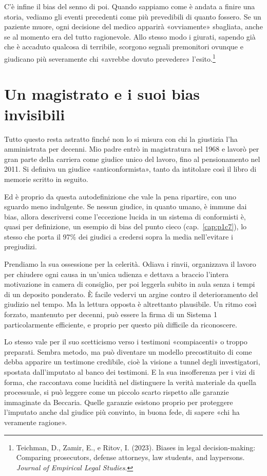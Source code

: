 C'\`{e} infine il bias del senno di poi. Quando sappiamo come \`{e} andata a finire una storia, vediamo gli eventi precedenti come pi\`{u} prevedibili di quanto fossero. Se un paziente muore, ogni decisione del medico apparir\`{a} «ovviamente» sbagliata, anche se al momento era del tutto ragionevole. Allo stesso modo i giurati, sapendo gi\`{a} che \`{e} accaduto qualcosa di terribile, scorgono segnali premonitori ovunque e giudicano pi\`{u} severamente chi «avrebbe dovuto prevedere» l'esito.\footnote{Teichman, D., Zamir, E., e Ritov, I. (2023). Biases in legal decision-making: Comparing prosecutors, defense attorneys, law students, and laypersons. \textit{Journal of Empirical Legal Studies}.}

\section{Un magistrato e i suoi bias invisibili}

Tutto questo resta astratto finch\'{e} non lo si misura con chi la giustizia l'ha amministrata per decenni. Mio padre entr\`{o} in magistratura nel 1968 e lavor\`{o} per gran parte della carriera come giudice unico del lavoro, fino al pensionamento nel 2011. Si definiva un giudice «anticonformista», tanto da intitolare cos\`{i} il libro di memorie scritto in seguito.

Ed \`{e} proprio da questa autodefinizione che vale la pena ripartire, con uno sguardo meno indulgente. Se nessun giudice, in quanto umano, \`{e} immune dai bias, allora descriversi come l'eccezione lucida in un sistema di conformisti \`{e}, quasi per definizione, un esempio di bias del punto cieco (cap.~\ref{cap:p1c7}), lo stesso che porta il 97\% dei giudici a credersi sopra la media nell'evitare i pregiudizi.

Prendiamo la sua ossessione per la celerit\`{a}. Odiava i rinvii, organizzava il lavoro per chiudere ogni causa in un'unica udienza e dettava a braccio l'intera motivazione in camera di consiglio, per poi leggerla subito in aula senza i tempi di un deposito ponderato. \`{E} facile vedervi un argine contro il deterioramento del giudizio nel tempo. Ma la lettura opposta \`{e} altrettanto plausibile. Un ritmo cos\`{i} forzato, mantenuto per decenni, pu\`{o} essere la firma di un Sistema 1 particolarmente efficiente, e proprio per questo pi\`{u} difficile da riconoscere.

Lo stesso vale per il suo scetticismo verso i testimoni «compiacenti» o troppo preparati. Sembra metodo, ma pu\`{o} diventare un modello precostituito di come debba apparire un testimone credibile, cioè la visione a tunnel degli investigatori, spostata dall'imputato al banco dei testimoni. E la sua insofferenza per i vizi di forma, che raccontava come lucidit\`{a} nel distinguere la verit\`{a} materiale da quella processuale, si pu\`{o} leggere come un piccolo scarto rispetto alle garanzie immaginate da Beccaria. Quelle garanzie esistono proprio per proteggere l'imputato anche dal giudice pi\`{u} convinto, in buona fede, di sapere «chi ha veramente ragione».

